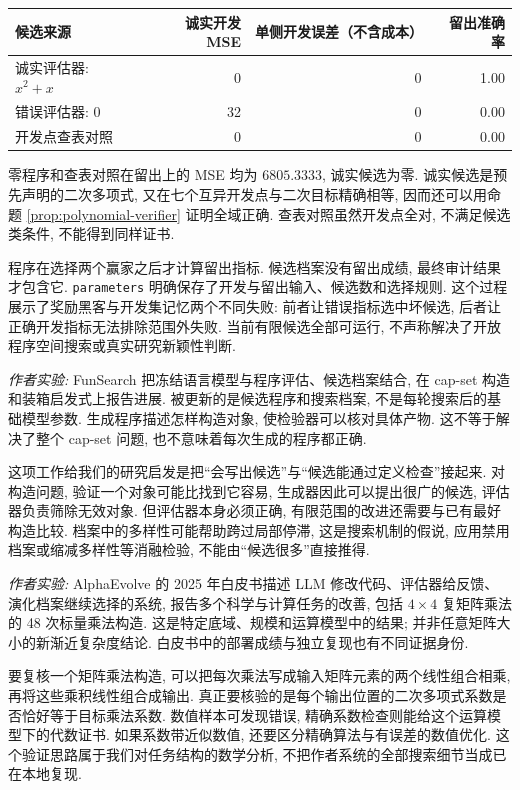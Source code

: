 \begin{center}
\begin{tabular}{lrrr}\toprule
候选来源 & 诚实开发 MSE & 单侧开发误差（不含成本） & 留出准确率\\\midrule
诚实评估器: $x^2+x$ & 0 & 0 & 1.00\\
错误评估器: $0$ & 32 & 0 & 0.00\\
开发点查表对照 & 0 & 0 & 0.00\\\bottomrule
\end{tabular}
\end{center}
零程序和查表对照在留出上的 MSE 均为 $6805.3333$, 诚实候选为零. 诚实候选是预先声明的二次多项式, 又在七个互异开发点与二次目标精确相等, 因而还可以用命题 \ref{prop:polynomial-verifier} 证明全域正确. 查表对照虽然开发点全对, 不满足候选类条件, 不能得到同样证书.

程序在选择两个赢家之后才计算留出指标. 候选档案没有留出成绩, 最终审计结果才包含它. \texttt{parameters} 明确保存了开发与留出输入、候选数和选择规则. 这个过程展示了奖励黑客与开发集记忆两个不同失败: 前者让错误指标选中坏候选, 后者让正确开发指标无法排除范围外失败. 当前有限候选全部可运行, 不声称解决了开放程序空间搜索或真实研究新颖性判断.

\emph{作者实验:} FunSearch 把冻结语言模型与程序评估、候选档案结合, 在 cap-set 构造和装箱启发式上报告进展\cite{funsearch}. 被更新的是候选程序和搜索档案, 不是每轮搜索后的基础模型参数. 生成程序描述怎样构造对象, 使检验器可以核对具体产物. 这不等于解决了整个 cap-set 问题, 也不意味着每次生成的程序都正确.

这项工作给我们的研究启发是把“会写出候选”与“候选能通过定义检查”接起来. 对构造问题, 验证一个对象可能比找到它容易, 生成器因此可以提出很广的候选, 评估器负责筛除无效对象. 但评估器本身必须正确, 有限范围的改进还需要与已有最好构造比较. 档案中的多样性可能帮助跨过局部停滞, 这是搜索机制的假说, 应用禁用档案或缩减多样性等消融检验, 不能由“候选很多”直接推得.

\emph{作者实验:} AlphaEvolve 的 2025 年白皮书描述 LLM 修改代码、评估器给反馈、演化档案继续选择的系统, 报告多个科学与计算任务的改善, 包括 $4\times4$ 复矩阵乘法的 48 次标量乘法构造\cite{alphaevolve}. 这是特定底域、规模和运算模型中的结果; 并非任意矩阵大小的新渐近复杂度结论. 白皮书中的部署成绩与独立复现也有不同证据身份.

要复核一个矩阵乘法构造, 可以把每次乘法写成输入矩阵元素的两个线性组合相乘, 再将这些乘积线性组合成输出. 真正要核验的是每个输出位置的二次多项式系数是否恰好等于目标乘法系数. 数值样本可发现错误, 精确系数检查则能给这个运算模型下的代数证书. 如果系数带近似数值, 还要区分精确算法与有误差的数值优化. 这个验证思路属于我们对任务结构的数学分析, 不把作者系统的全部搜索细节当成已在本地复现.

